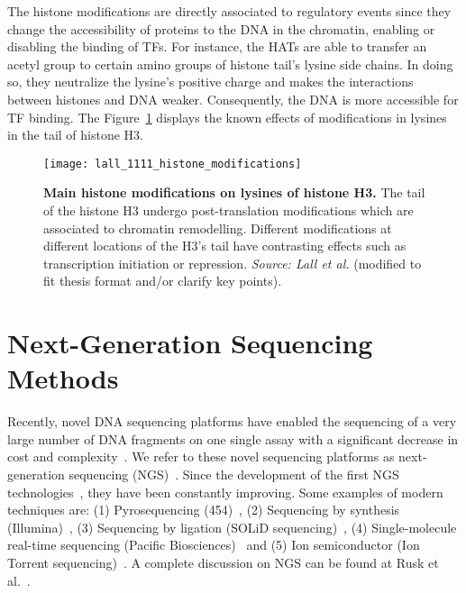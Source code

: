 The histone modifications are directly associated to regulatory events since they change the accessibility of proteins to the DNA in the chromatin, enabling or disabling the binding of TFs. For instance, the HATs are able to transfer an acetyl group to certain amino groups of histone tail's lysine side chains. In doing so, they neutralize the lysine's positive charge and makes the interactions between histones and DNA weaker. Consequently, the DNA is more accessible for TF binding. The Figure~\ref{fig:lall_histone_modifications} displays the known effects of modifications in lysines in the tail of histone H3.

\begin{figure}[h!]
\centering
\texttt{[image: lall\_1111\_histone\_modifications]}
\caption[Main histone modifications on lysines of histone H3]{\textbf{Main histone modifications on lysines of histone H3.} The tail of the histone H3 undergo post-translation modifications which are associated to chromatin remodelling. Different modifications at different locations of the H3's tail have contrasting effects such as transcription initiation or repression. \emph{Source: Lall et al.}\cite{lall2007} (modified to fit thesis format and/or clarify key points).}
\label{fig:lall_histone_modifications}
\end{figure}

\section{Next-Generation Sequencing Methods}
\label{sec:ngs.methods}

Recently, novel DNA sequencing platforms have enabled the sequencing of a very large number of DNA fragments on one single assay with a significant decrease in cost and complexity~\cite{hayden2014}. We refer to these novel sequencing platforms as next-generation sequencing (NGS)~\cite{shendure2008}. Since the development of the first NGS technologies~\cite{tucker2009}, they have been constantly improving. Some examples of modern techniques are: (1) Pyrosequencing (454)~\cite{margulies2005}, (2) Sequencing by synthesis (Illumina)~\cite{bentley2008}, (3) Sequencing by ligation (SOLiD sequencing)~\cite{valouev2008}, (4) Single-molecule real-time sequencing (Pacific Biosciences)~\cite{eid2009} and (5) Ion semiconductor (Ion Torrent sequencing)~\cite{pennisi2010}. A complete discussion on NGS can be found at Rusk et al.~\cite{rusk2010}.

